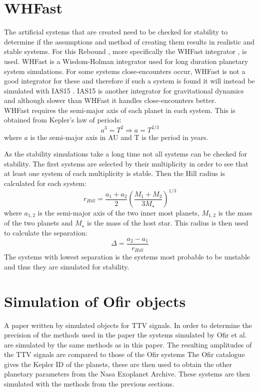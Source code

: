 \documentclass[12pt]{report}
\begin{document}
\section{WHFast}
	The artificial systems that are created need to be checked for stability to determine if the assumptions and method of creating them results in realistic and stable systems. For this Rebound \citep{2012A&A...537A.128R}, more specifically the WHFast integrator \citep{2015MNRAS.452..376R}, is used. WHFast is a Wisdom-Holman integrator used for long duration planetary system simulations. For some systems close-encounters occur, WHFast is not a good integrator for these and therefore if such a system is found it will instead be simulated with IAS15 \citep{2015MNRAS.446.1424R}. IAS15 is another integrator for gravitational dynamics and although slower than WHFast it handles close-encounters better.\\
	
	WHFast requires the semi-major axis of each planet in each system. This is obtained from Kepler's law of periods:
	\begin{equation}
		a^3 = T^2 \Rightarrow a = T^{2/3}
	\end{equation}
		where $a$ is the semi-major axis in AU and T is the period in years. 
		
	As the stability simulations take a long time not all systems can be checked for stability. The first systems are selected by their multiplicity in order to see that at least one system of each multiplicity is stable. Then the Hill radius is calculated for each system:
	\begin{equation}
		r_{Hill} = \frac{a_1 + a_2}{2}\left(\frac{M_1 + M_2}{3M_{\star}}\right)^{1/3}
	\end{equation}
	where $a_{1,2}$ is the semi-major axis of the two inner most planets, $M_{1,2}$ is the mass of the two planets and $M_{\star}$ is the mass of the host star. This radius is then used to calculate the separation:
	\begin{equation}
		\Delta = \frac{a_2 - a_1}{r_{Hill}}
	\end{equation}
	The systems with lowest separation is the systems most probable to be unstable and thus they are simulated for stability.
	
\section{Simulation of Ofir objects}
	A paper written by \cite{2018ApJS..234....9O} simulated objects for TTV signals. In order to determine the precision of the methods used in the paper the systems simulated by Ofir et al. are simulated by the same methods as in this paper. The resulting amplitudes of the TTV signals are compared to those of the Ofir systems The Ofir catalogue gives the Kepler ID of the planets, these are then used to obtain the other planetary parameters from the Nasa Exoplanet Archive. These systems are then simulated with the methods from the previous sections.
	
\end{document}

